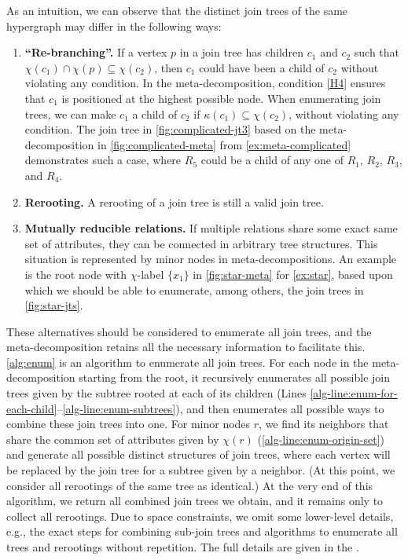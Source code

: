 As an intuition, we can observe that the distinct join trees of the same hypergraph may differ in the following ways:
\begin{enumerate}[leftmargin=*]
    \item \textbf{``Re-branching''.} If a vertex $p$ in a join tree has children $c_1$ and $c_2$ such that
    $\chi(c_1) \cap \chi(p) \subseteq \chi(c_2)$,
    then $c_1$ could have been a child of $c_2$ without violating any condition. In the meta-decomposition, condition \ref{H4} ensures that $c_1$ is positioned at the highest possible node. When enumerating join trees, we can make $c_1$ a child of $c_2$ if $\kappa(c_1) \subseteq \chi(c_2)$, without violating any condition. The join tree in \cref{fig:complicated-jt3} based on the meta-decomposition in \cref{fig:complicated-meta} from \cref{ex:meta-complicated} demonstrates such a case, where $R_5$ could be a child of any one of $R_1$, $R_2$, $R_3$, and $R_4$.
    \item \textbf{Rerooting.} A rerooting of a join tree is still a valid join tree.
    \item \textbf{Mutually reducible relations.} If multiple relations share some exact same set of attributes, they can be connected in arbitrary tree structures. This situation is represented by minor nodes in meta-decompositions. An example is the root node with $\chi$-label $\{ x_1 \}$ in \cref{fig:star-meta} for \cref{ex:star}, based upon which we should be able to enumerate, among others, the join trees in \cref{fig:star-jts}.
\end{enumerate}

These alternatives should be considered to enumerate all join trees, and the meta-decomposition retains all the necessary information to facilitate this. \cref{alg:enum} is an algorithm to enumerate all join trees. For each node in the meta-decomposition starting from the root, it recursively enumerates all possible join trees given by the subtree rooted at each of its children (Lines \ref{alg-line:enum-for-each-child}--\ref{alg-line:enum-subtrees}), and then enumerates all possible ways to combine these join trees into one. For minor nodes $r$, we find its neighbors that share the common set of attributes given by $\chi(r)$ (\cref{alg-line:enum-origin-set}) and generate all possible distinct structures of join trees, where each vertex will be replaced by the join tree for a subtree given by a neighbor. (At this point, we consider all rerootings of the same tree as identical.) At the very end of this algorithm, we return all combined join trees we obtain, and it remains only to collect all rerootings.  Due to space constraints, we omit some lower-level details, e.g., the exact steps for combining sub-join trees and algorithms to enumerate all trees and rerootings without repetition. The full details are given in the \arxivorappendix.

